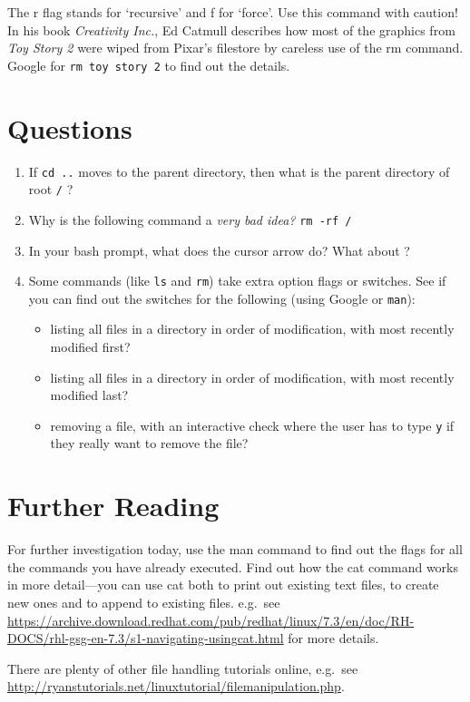 \documentclass{article}
\begin{document}
The r flag stands for `recursive' and f for `force'. Use this command with caution! In his book \textit{Creativity Inc.}, Ed Catmull describes how most of the graphics from \textit{Toy Story 2} were wiped from Pixar's filestore by careless use of the rm command. Google for \texttt{rm toy story 2} to find out the details.

\section*{Questions}

\begin{enumerate}
\item If \texttt{cd ..} moves to the parent directory, then what is the parent directory of root \texttt{/} ?
\item Why is the following command a \emph{very bad idea?} \texttt{rm -rf /}
\item In your bash prompt, what does the \keys{\arrowkeyup}  cursor arrow do? What about \keys{\arrowkeydown}?
\item Some commands (like \texttt{ls} and \texttt{rm}) take extra option flags or switches. See if you can find out the switches for the following (using Google or \texttt{man}):
  \begin{itemize}
  \item listing all files in a directory in order of modification, with most recently modified first?
  \item listing all files in a directory in order of modification, with most recently modified last?
  \item removing a file, with an interactive check where the user has to type \texttt{y} if they really want to remove the file?
  \end{itemize}
\end{enumerate}


\section*{Further Reading}

For further investigation today, use the man command to find out 
the flags for all the commands you have already executed.
Find out how the cat command works in more detail---you can use cat both to print out existing text files, to create new ones and to append to existing files. e.g.\ see \url{https://archive.download.redhat.com/pub/redhat/linux/7.3/en/doc/RH-DOCS/rhl-gsg-en-7.3/s1-navigating-usingcat.html} for more details.

There are plenty of other file handling tutorials online, e.g.\ see \url{http://ryanstutorials.net/linuxtutorial/filemanipulation.php}.
\end{document}
